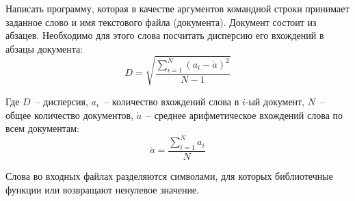 
Написать программу, которая в качестве аргументов командной строки
принимает заданное слово и имя текстового файла (документа). Документ
состоит из абзацев. Необходимо для этого слова посчитать дисперсию его
вхождений в абзацы документа:
$$
	D=\sqrt{ \frac{ \sum^N_{i = 1}{ (a_i-\acute{a})^2 } }{ N - 1 } }
$$

Где $D$~-- дисперсия, $a_i$~-- количество вхождений слова в $i$-ый документ, $N$~-- общее количество документов,
$\acute{a}$~-- среднее арифметическое вхождений слова по всем документам:
$$
	\acute{a} = \frac{ \sum^N_{i=1}{a_i} }{N}
$$

Слова во входных файлах разделяются символами, для которых
библиотечные функции  или  возвращают ненулевое
значение.

